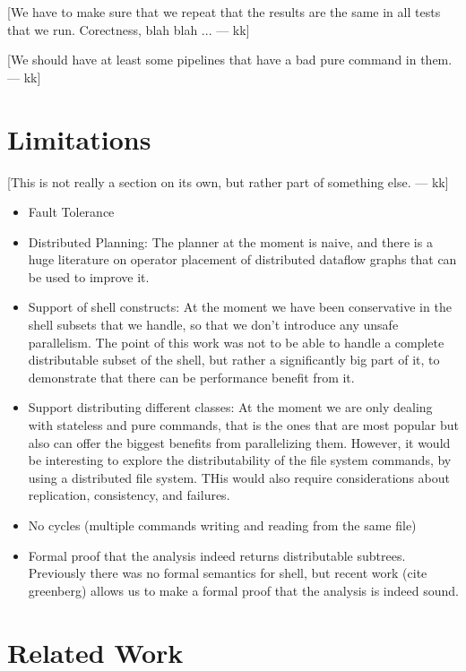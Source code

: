 \documentclass[sigplan,10pt,review,anonymous]{acmart}
\newcommand{\kk}[1]{[{\color{magenta}#1 --- kk}]}
\begin{document}
\kk{We have to make sure that we repeat that the results are the same
  in all tests that we run. Corectness, blah blah ...}

\kk{We should have at least some pipelines that have a bad pure
  command in them.}

\section{Limitations}

\kk{This is not really a section on its own, but rather part of something else.}

\begin{itemize}
\item Fault Tolerance
\item Distributed Planning: The planner at the moment is naive, and
  there is a huge literature on operator placement of distributed
  dataflow graphs that can be used to improve it.
\item Support of shell constructs: At the moment we have been
  conservative in the shell subsets that we handle, so that we don't
  introduce any unsafe parallelism. The point of this work was not to
  be able to handle a complete distributable subset of the shell, but
  rather a significantly big part of it, to demonstrate that there can
  be performance benefit from it.
\item Support distributing different classes: At the moment we are
  only dealing with stateless and pure commands, that is the ones that
  are most popular but also can offer the biggest benefits from
  parallelizing them. However, it would be interesting to explore the
  distributability of the file system commands, by using a distributed
  file system. THis would also require considerations about
  replication, consistency, and failures.
\item No cycles (multiple commands writing and reading from the same file)
\item Formal proof that the analysis indeed returns distributable
  subtrees. Previously there was no formal semantics for shell, but
  recent work (cite greenberg) allows us to make a formal proof that
  the analysis is indeed sound.
\end{itemize}

\section{Related Work}
\label{related}
\end{document}
